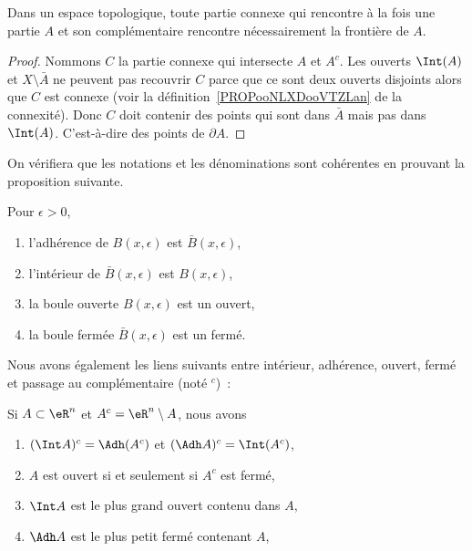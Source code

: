\begin{lemma}        \label{LEMooLKWEooItGnkP}
	Dans un espace topologique, toute partie connexe qui rencontre à la fois une partie \( A\) et son complémentaire rencontre nécessairement la frontière de \( A\).
\end{lemma}

\begin{proof}
	Nommons \( C\) la partie connexe qui intersecte \( A\) et \( A^c\). Les ouverts \( \Int(A)\) et \( X\setminus \bar A\) ne peuvent pas recouvrir \( C\) parce que ce sont deux ouverts disjoints alors que \( C\) est connexe (voir la définition~\ref{PROPooNLXDooVTZLan} de la connexité). Donc \( C\) doit contenir des points qui sont dans \( \bar A\) mais pas dans \( \Int(A)\). C'est-à-dire des points de \( \partial A\).
\end{proof}

On vérifiera que les notations et les dénominations sont cohérentes en prouvant la proposition suivante.
\begin{proposition}Pour \( \epsilon > 0\),
	\begin{enumerate}
		\item l'adhérence de \( B(x,\epsilon)\) est \( \bar B(x,\epsilon)\),
		\item l'intérieur de \( \bar B(x,\epsilon)\) est \( B(x,\epsilon)\),
		\item la boule ouverte \( B(x,\epsilon)\) est un ouvert,
		\item la boule fermée \( \bar B(x,\epsilon)\) est un fermé.
	\end{enumerate}
\end{proposition}

Nous avons également les liens suivants entre intérieur, adhérence, ouvert, fermé et passage au complémentaire (noté \( {}^c\))~:
\begin{proposition}
	Si \( A \subset \eR^n\) et \( A^c = \eR^n\setminus A\), nous
	avons
	\begin{enumerate}
		\item \( (\Int A)^c = \Adh (A^c)\) et \( (\Adh A)^c = \Int
		      (A^c)\),
		\item \( A\) est ouvert si et seulement si \( A^c\) est fermé,
		\item \( \Int A\) est le plus grand ouvert contenu dans \( A\),
		\item \( \Adh A\) est le plus petit fermé contenant \( A\),
	\end{enumerate}
\end{proposition}

